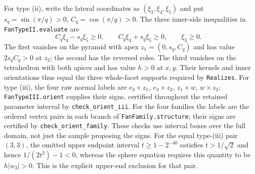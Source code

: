 \documentclass[11pt]{article}
\theoremstyle{definition}
\theoremstyle{remark}
\begin{document}
For type (ii), write the lateral coordinates as
$(\xi_3,\xi_4,\xi_5)$ and put
$s_q=\sin(\pi/q)>0$, $C_q=\cos(\pi/q)>0$.
The three inner-side inequalities in \texttt{FanTypeII.evaluate} are
\[
 C_q\xi_4-s_q\xi_5\ge0,\qquad
 C_q\xi_4+s_q\xi_5\ge0,\qquad \xi_3\ge0.
\]
The first vanishes on the pyramid with apex
$z_1=(0,s_q,C_q)$ and has value $2s_qC_q>0$ at $z_2$;
the second has the reversed roles. The third vanishes on the tetrahedron
with both apices and has value $h>0$ at $x,y$.
Their kernels and inner orientations thus equal the three whole-facet
supports required by \texttt{Realizes}. For type (iii), the four raw
normal labels are
$e_3\times z_1$, $e_3\times z_2$, $z_1\times w$, $w\times z_2$;
\texttt{FanTypeIII.orient} supplies their signs, certified throughout
the retained parameter interval by \texttt{check\_orient\_iii}.
For the four families the labels are the ordered vertex pairs in each
branch of \texttt{FanFamily.structure}; their signs are certified by
\texttt{check\_orient\_family}. These checks use interval boxes over
the full domain, not just the sample proposing the signs.
For the equal type-(iii) pair $(3,3)$, the omitted upper endpoint
interval $t\ge1-2^{-40}$ satisfies $t>1/\sqrt2$ and hence
$1/(2t^2)-1<0$, whereas the sphere equation requires this quantity to be
$h|w_3|>0$. This is the explicit upper-end exclusion for that pair.
\end{document}
